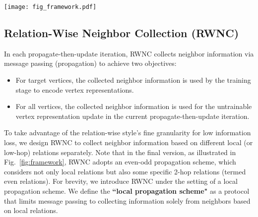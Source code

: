 \documentclass[lettersize,journal]{IEEEtran}
\begin{document}
\begin{figure*}[!t]
\vspace{-6mm}
\centering\texttt{[image: fig\_framework.pdf]}
\vspace{-3mm}
\caption{
Overall Framework of the proposed hybrid pre-computation-based HGNN, Random Projection Heterogeneous Graph Neural Network (RpHGNN).
(1) Pre-computation stage:
To leverage the representation-wise style’s efficiency, the main framework of RpHGNN consists of propagate-then-update iterations, where we introduce a Random Projection Squashing component to reduce dimensionality for updated vertex representations, ensuring that the complexity increases only linearly.
To exploit the relation-wise style’s fine granularity for low information loss, we introduce a Relation-wise Neighbor Collection component with an Even-odd Propagation Scheme, which collects neighbor information based on different local (or low-hop) relations separately.
(2) Training Stage:
After $K$ iterations, the collected neighbor information (of target vertices) is used as the input for a learnable encoder to learn the vertex representations of target vertices.
}
\label{fig:framework}
 \vspace{-4mm}
\end{figure*}




\subsection{Relation-Wise Neighbor Collection (RWNC)}

In each propagate-then-update iteration, RWNC collects neighbor information via message passing (propagation) to achieve two objectives:
\begin{itemize}
\item For target vertices, the collected neighbor information is used by the training stage to encode vertex representations.
\item For all vertices, the collected neighbor information is used for the untrainable vertex representation update in the current propagate-then-update iteration.
\end{itemize}


To take advantage of the relation-wise style's fine granularity for low information loss, we design RWNC to collect neighbor information based on different local (or low-hop) relations separately.
Note that in the final version, as illustrated in Fig.~\ref{fig:framework}, RWNC adopts an even-odd propagation scheme, which considers not only local relations but also some specific 2-hop relations (termed even relations).
For brevity, we introduce RWNC under the setting of a local propagation scheme.
We define the \textbf{``local propagation scheme"} as a protocol that limits message passing to collecting information solely from neighbors based on local relations.
\end{document}

